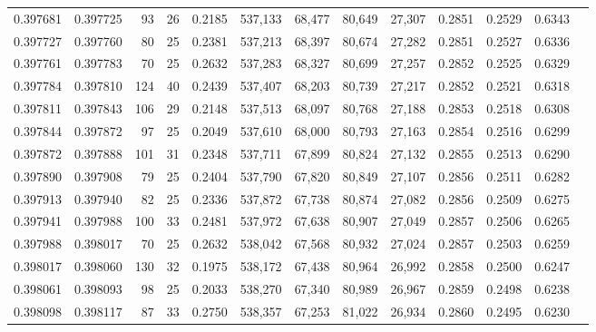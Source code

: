 \begin{tabular}{rrrrrrrrrrrrr}
0.397681 & 0.397725 &    93 &  26 &                                     0.2185 & 537,133 &  68,477 &  80,649 &  27,307 & 0.2851 & 0.2529 & 0.6343 \\
0.397727 & 0.397760 &    80 &  25 &                                     0.2381 & 537,213 &  68,397 &  80,674 &  27,282 & 0.2851 & 0.2527 & 0.6336 \\
0.397761 & 0.397783 &    70 &  25 &                                     0.2632 & 537,283 &  68,327 &  80,699 &  27,257 & 0.2852 & 0.2525 & 0.6329 \\
0.397784 & 0.397810 &   124 &  40 &                                     0.2439 & 537,407 &  68,203 &  80,739 &  27,217 & 0.2852 & 0.2521 & 0.6318 \\
0.397811 & 0.397843 &   106 &  29 &                                     0.2148 & 537,513 &  68,097 &  80,768 &  27,188 & 0.2853 & 0.2518 & 0.6308 \\
0.397844 & 0.397872 &    97 &  25 &                                     0.2049 & 537,610 &  68,000 &  80,793 &  27,163 & 0.2854 & 0.2516 & 0.6299 \\
0.397872 & 0.397888 &   101 &  31 &                                     0.2348 & 537,711 &  67,899 &  80,824 &  27,132 & 0.2855 & 0.2513 & 0.6290 \\
0.397890 & 0.397908 &    79 &  25 &                                     0.2404 & 537,790 &  67,820 &  80,849 &  27,107 & 0.2856 & 0.2511 & 0.6282 \\
0.397913 & 0.397940 &    82 &  25 &                                     0.2336 & 537,872 &  67,738 &  80,874 &  27,082 & 0.2856 & 0.2509 & 0.6275 \\
0.397941 & 0.397988 &   100 &  33 &                                     0.2481 & 537,972 &  67,638 &  80,907 &  27,049 & 0.2857 & 0.2506 & 0.6265 \\
0.397988 & 0.398017 &    70 &  25 &                                     0.2632 & 538,042 &  67,568 &  80,932 &  27,024 & 0.2857 & 0.2503 & 0.6259 \\
0.398017 & 0.398060 &   130 &  32 &                                     0.1975 & 538,172 &  67,438 &  80,964 &  26,992 & 0.2858 & 0.2500 & 0.6247 \\
0.398061 & 0.398093 &    98 &  25 &                                     0.2033 & 538,270 &  67,340 &  80,989 &  26,967 & 0.2859 & 0.2498 & 0.6238 \\
0.398098 & 0.398117 &    87 &  33 &                                     0.2750 & 538,357 &  67,253 &  81,022 &  26,934 & 0.2860 & 0.2495 & 0.6230 \\

\end{tabular}
